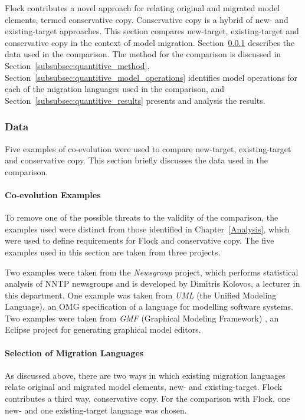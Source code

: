 Flock contributes a novel approach for relating original and migrated model elements, termed conservative copy. Conservative copy is a hybrid of new- and existing-target approaches. This section compares new-target, existing-target and conservative copy in the context of model migration. Section~\ref{subsubsec:quantitive_data} describes the data used in the comparison. The method for the comparison is discussed in Section~\ref{subsubsec:quantitive_method}. Section~\ref{subsubsec:quantitive_model_operations} identifies model operations for each of the migration languages used in the comparison, and Section~\ref{subsubsec:quantitive_results} presents and analysis the results.

\subsubsection{Data}
\label{subsubsec:quantitive_data}
Five examples of co-evolution were used to compare new-target, existing-target and conservative copy. This section briefly discusses the data used in the comparison.

\paragraph{Co-evolution Examples}
To remove one of the possible threats to the validity of the comparison, the examples used were distinct from those identified in Chapter~\ref{Analysis}, which were used to define requirements for Flock and conservative copy. The five examples used in this section are taken from three projects.

Two examples were taken from the \emph{Newsgroup} project, which performs statistical analysis of NNTP newsgroups and is developed by Dimitris Kolovos, a lecturer in this department. One example was taken from \emph{UML} (the Unified Modeling Language), an OMG specification of a language for modelling software systems. Two examples were taken from \emph{GMF} (Graphical Modeling Framework) \cite{gronback06gmf}, an Eclipse project for generating graphical model editors.

\paragraph{Selection of Migration Languages}
As discussed above, there are two ways in which existing migration languages relate original and migrated model elements, new- and existing-target. Flock contributes a third way, conservative copy. For the comparison with Flock, one new- and one existing-target language was chosen.

